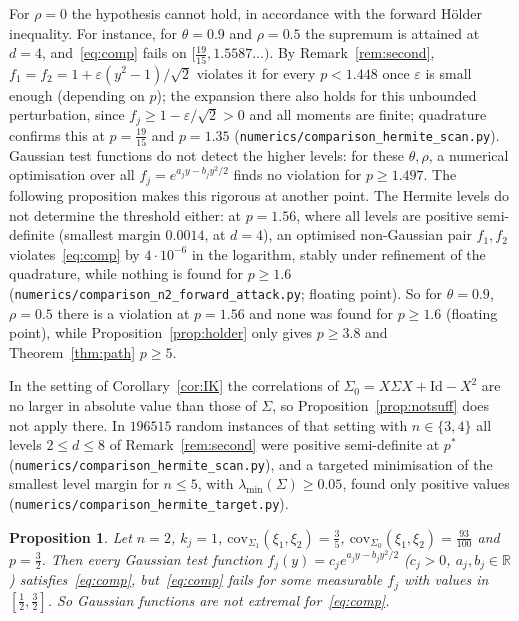 \documentclass[11pt]{amsart}
\newtheorem{proposition}[theorem]{Proposition}
\theoremstyle{definition}
\newcommand{\R}{\mathbb{R}}
\newcommand{\Id}{\mathrm{Id}}
\begin{document}
For $\rho=0$ the hypothesis cannot hold, in accordance with the forward H\"older inequality. For instance, for
$\theta=0.9$ and $\rho=0.5$ the supremum is attained at $d=4$, and~\eqref{eq:comp} fails on
$[\frac{19}{15},1.5587\ldots)$. By Remark~\ref{rem:second}, $f_1=f_2=1+\varepsilon(y^2-1)/\sqrt2$ violates it for every
$p<1.448$ once $\varepsilon$ is small enough (depending on $p$); the expansion there also holds for this unbounded
perturbation, since $f_j\ge1-\varepsilon/\sqrt2>0$ and all moments are finite; quadrature confirms this at $p=\frac{19}{15}$ and
$p=1.35$ (\texttt{numerics/comparison\_hermite\_scan.py}). Gaussian test functions do not detect the
higher levels: for these $\theta,\rho$, a numerical optimisation over all $f_j=e^{a_jy-b_jy^2/2}$ finds no violation
for $p\ge1.497$. The following proposition makes this rigorous at another point. The Hermite levels do not
determine the threshold either: at $p=1.56$, where all levels are positive semi-definite (smallest margin
$0.0014$, at $d=4$), an optimised non-Gaussian pair $f_1,f_2$ violates~\eqref{eq:comp} by $4\cdot10^{-6}$ in the
logarithm, stably under refinement of the quadrature, while nothing is found for $p\ge1.6$
(\texttt{numerics/comparison\_n2\_forward\_attack.py}; floating point). So for $\theta=0.9$, $\rho=0.5$
there is a violation at $p=1.56$ and none was found for $p\ge1.6$ (floating point), while Proposition~\ref{prop:holder}
only gives $p\ge3.8$ and Theorem~\ref{thm:path} $p\ge5$.

In the setting of Corollary~\ref{cor:IK} the correlations of $\Sigma_0=X\Sigma X+\Id-X^2$ are no larger in absolute
value than those of $\Sigma$, so Proposition~\ref{prop:notsuff} does not apply there. In $196515$ random instances of
that setting with $n\in\{3,4\}$ all levels $2\le d\le8$ of Remark~\ref{rem:second} were positive semi-definite at $p^*$
(\texttt{numerics/comparison\_hermite\_scan.py}), and a targeted minimisation of the smallest level margin for
$n\le5$, with $\lambda_{\min}(\Sigma)\ge0.05$, found only positive values
(\texttt{numerics/comparison\_hermite\_target.py}).

\begin{proposition}\label{prop:gauss}
Let $n=2$, $k_j=1$, $\mathrm{cov}_{\Sigma_1}(\xi_1,\xi_2)=\frac35$, $\mathrm{cov}_{\Sigma_0}(\xi_1,\xi_2)=\frac{93}{100}$ and
$p=\frac32$. Then every Gaussian test function $f_j(y)=c_je^{a_jy-b_jy^2/2}$ ($c_j>0$, $a_j,b_j\in\R$)
satisfies~\eqref{eq:comp}, but~\eqref{eq:comp} fails for some measurable $f_j$ with values in $[\frac12,\frac32]$. So
Gaussian functions are not extremal for~\eqref{eq:comp}.
\end{proposition}
\end{document}
